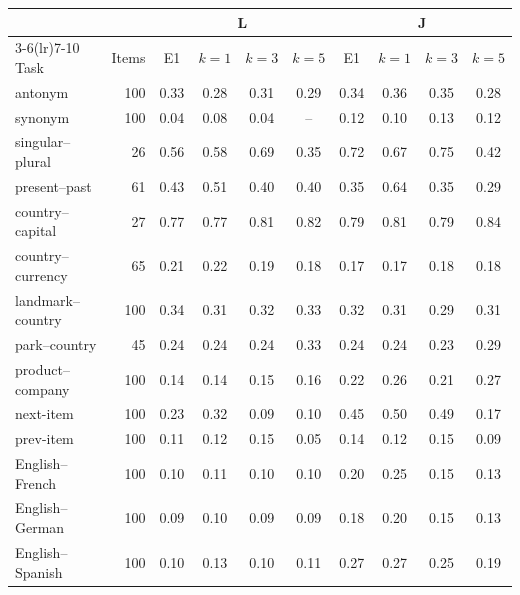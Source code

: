 \begin{tabular}{@{}lrcccccccc@{}}
\toprule
 & & \multicolumn{4}{c}{L} & \multicolumn{4}{c}{J} \\
\cmidrule(lr){3-6}\cmidrule(lr){7-10}
Task & Items & E1 & $k=1$ & $k=3$ & $k=5$ & E1 & $k=1$ & $k=3$ & $k=5$ \\
\midrule
antonym & 100 & 0.33 & 0.28 & 0.31 & 0.29 & 0.34 & 0.36 & 0.35 & 0.28 \\
synonym & 100 & 0.04 & 0.08 & 0.04 & -- & 0.12 & 0.10 & 0.13 & 0.12 \\
singular--plural & 26 & 0.56 & 0.58 & 0.69 & 0.35 & 0.72 & 0.67 & 0.75 & 0.42 \\
present--past & 61 & 0.43 & 0.51 & 0.40 & 0.40 & 0.35 & 0.64 & 0.35 & 0.29 \\
country--capital & 27 & 0.77 & 0.77 & 0.81 & 0.82 & 0.79 & 0.81 & 0.79 & 0.84 \\
country--currency & 65 & 0.21 & 0.22 & 0.19 & 0.18 & 0.17 & 0.17 & 0.18 & 0.18 \\
landmark--country & 100 & 0.34 & 0.31 & 0.32 & 0.33 & 0.32 & 0.31 & 0.29 & 0.31 \\
park--country & 45 & 0.24 & 0.24 & 0.24 & 0.33 & 0.24 & 0.24 & 0.23 & 0.29 \\
product--company & 100 & 0.14 & 0.14 & 0.15 & 0.16 & 0.22 & 0.26 & 0.21 & 0.27 \\
next-item & 100 & 0.23 & 0.32 & 0.09 & 0.10 & 0.45 & 0.50 & 0.49 & 0.17 \\
prev-item & 100 & 0.11 & 0.12 & 0.15 & 0.05 & 0.14 & 0.12 & 0.15 & 0.09 \\
English--French & 100 & 0.10 & 0.11 & 0.10 & 0.10 & 0.20 & 0.25 & 0.15 & 0.13 \\
English--German & 100 & 0.09 & 0.10 & 0.09 & 0.09 & 0.18 & 0.20 & 0.15 & 0.13 \\
English--Spanish & 100 & 0.10 & 0.13 & 0.10 & 0.11 & 0.27 & 0.27 & 0.25 & 0.19 \\
\bottomrule
\end{tabular}
